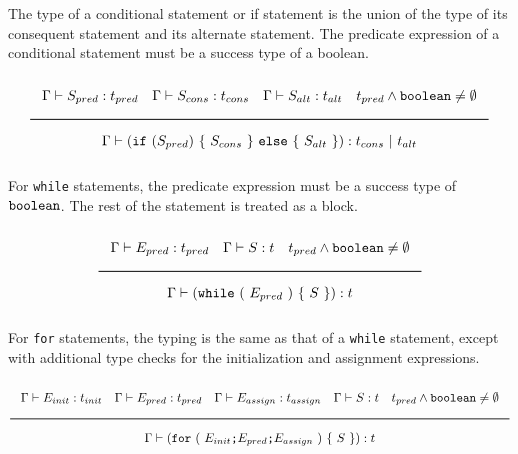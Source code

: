 The type of a conditional statement or if statement is the union of the type of its consequent statement and its alternate statement.
The predicate expression of a conditional statement must be a success type of a boolean.

\noindent
\[
  \Rule{\Gamma \vdash S_{pred} : t_{pred} \quad \Gamma \vdash S_{cons} : t_{cons} \quad \Gamma \vdash S_{alt} : t_{alt}
    \quad t_{pred} \wedge \Bool \neq \emptyset}{\Gamma \vdash (\texttt{if}\ (S_{pred})\ \{\ S_{cons}\ \}\
    \texttt{else}\ \{\ S_{alt}\ \}) : t_{cons}\ |\ t_{alt}}
\]
\noindent

For \texttt{while} statements, the predicate expression must be a success type of $\texttt{boolean}$. The rest of the statement is treated as a block.

\noindent
\[
  \Rule{\Gamma \vdash E_{pred} : t_{pred} \quad \Gamma \vdash S : t \quad t_{pred} \wedge \Bool \neq \emptyset}{
    \Gamma \vdash (\texttt{while}\ (\ E_{pred}\ )\ \{\ S\ \}) : t}
\]
\noindent

For \texttt{for} statements, the typing is the same as that of a \texttt{while} statement,
except with additional type checks for the initialization and assignment expressions.

\noindent
\[
  \Rule{\Gamma \vdash E_{init} : t_{init} \quad \Gamma \vdash E_{pred} : t_{pred} \quad \Gamma \vdash E_{assign} : t_{assign} \quad
    \Gamma \vdash S : t \quad t_{pred} \wedge \Bool \neq \emptyset}{
    \Gamma \vdash (\texttt{for}\ (\ E_{init} \texttt{;} E_{pred} \texttt{;} E_{assign}\ )\ \{\ S\ \}) : t}
\]
\noindent
